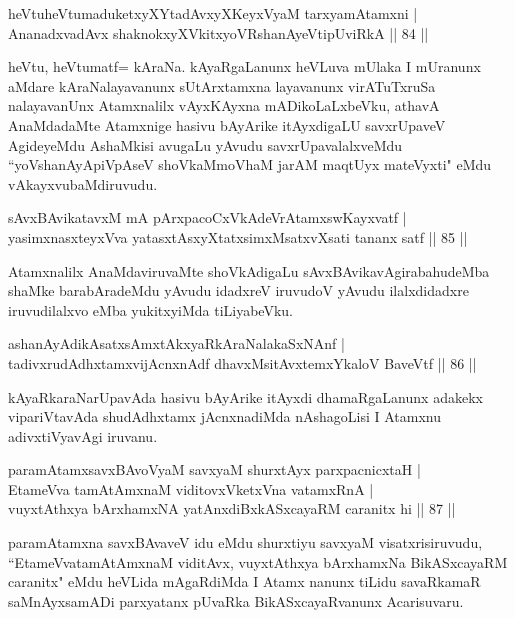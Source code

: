 \begin{shl}
heVtuheVtumaduketxyXYtadAvxyXKeyxVyaM tarxyamAtamxni |\\
AnanadxvadAvx shaknokxyXVkitxyoVR\s shanAyeVtipUviRkA \hfill || 84 ||
\end{shl}

\begin{artha}
heVtu, heVtumatf= kAraNa. kAyaRgaLanunx heVLuva mUlaka I mUranunx aMdare kAraNalayavanunx sUtArxtamxna layavanunx virATuTxruSa nalayavanUnx Atamxnalilx vAyxKAyxna mADikoLaLxbeVku, athavA AnaMdadaMte Atamxnige hasivu bAyArike itAyxdigaLU savxrUpaveV AgideyeMdu AshaMkisi avugaLu yAvudu savxrUpavalalxveMdu ``yoV\s shanAyApiVpAseV shoVkaMmoVhaM jarAM maqtUyx  mateVyxti" eMdu vAkayxvubaMdiruvudu.
\end{artha}

\begin{shl}
sAvxBAvikatavxM mA pArxpacoCxVkAdeVrAtamxswKayxvatf |\\
yasimxnasxteyxVva yatasxtAsxyXtatxsimxMsatxvXsati tananx satf \hfill || 85 ||
\end{shl}

\begin{artha}%
Atamxnalilx AnaMdaviruvaMte shoVkAdigaLu sAvxBAvikavAgirabahudeMba shaMke barabAradeMdu yAvudu idadxreV iruvudoV yAvudu ilalxdidadxre iruvudilalxvo eMba yukitxyiMda tiLiyabeVku.
\end{artha}

\begin{shl}
ashanAyAdikAsatxsAmxtAkxyaRkAraNalakaSxNAnf |\\
tadivxrudAdhxtamxvijAcnxnAdf dhavxMsitAvx\s \s temxYkaloV BaveVtf \hfill || 86 ||
\end{shl}

\begin{artha}
kAyaRkaraNarUpavAda hasivu bAyArike itAyxdi dhamaRgaLanunx adakekx vipariVtavAda shudAdhxtamx jAcnxnadiMda nAshagoLisi I Atamxnu adivxtiVyavAgi iruvanu.
\end{artha}

\begin{shl}
paramAtamxsavxBAvoV\s yaM savxyaM shurxtAyx parxpacnicxtaH |\\
EtameVva tamAtAmxnaM viditovxVketxVna vatamxRnA |\\
vuyxtAthxya bArxhamxNA yatAnxdiBxkASxcayaRM caranitx hi \hfill || 87 ||
\end{shl}

\begin{artha}
paramAtamxna savxBAvaveV idu eMdu shurxtiyu savxyaM visatxrisiruvudu, ``EtameVvatamAtAmxnaM viditAvx, vuyxtAthxya bArxhamxNa BikASxcayaRM caranitx" eMdu heVLida mAgaRdiMda I Atamx nanunx tiLidu savaRkamaR saMnAyxsamADi parxyatanx pUvaRka BikASxcayaRvanunx Acarisuvaru.
\end{artha}

